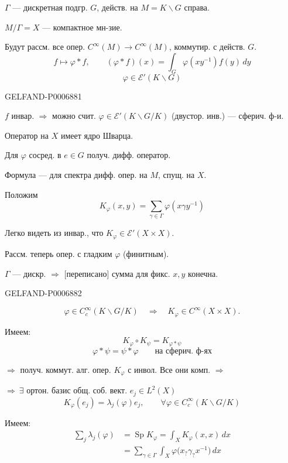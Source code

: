 \(\Gamma\) --- дискретная подгр. \(G\), действ. на \(M=K\backslash G\) справа.

\(M/\Gamma=X\) --- компактное мн-зие.

Будут рассм. все опер. \(C^\infty(M)\to C^\infty(M)\),
коммутир. с действ. \(G\).
\[
f\longmapsto\varphi*f,\qquad
(\varphi*f)(x)=\int_G\varphi(xy^{-1})f(y)\,dy
\]
\[
\varphi\in\mathcal E'(K\backslash G)
\]


\begin{GelfandAdjacentEvidence}{GELFAND-P000688}{1}

\(f\) инвар. \(\Rightarrow\) можно счит.
\(\varphi\in\mathcal E'(K\backslash G/K)\)
(двустор. инв.) --- сферич. ф-и.

Оператор на \(X\) имеет ядро Шварца.

Для \(\varphi\) сосред. в \(e\in G\) получ. дифф. оператор.

Формула --- для спектра дифф. опер. на \(M\), спущ. на \(X\).

Положим
\[
K_\varphi(x,y)=\sum_{\gamma\in\Gamma}\varphi(x\gamma y^{-1})
\]

Легко видеть из инвар., что \(K_\varphi\in\mathcal E'(X\times X)\).

Рассм. теперь опер. с гладким \(\varphi\) (финитным).

\(\Gamma\) --- дискр. \(\Rightarrow\) [переписано] сумма для фикс. \(x,y\) конечна.
\end{GelfandAdjacentEvidence}
\begin{GelfandAdjacentEvidence}{GELFAND-P000688}{2}

\[
\varphi\in C_c^\infty(K\backslash G/K)
\quad\Rightarrow\quad K_\varphi\in C^\infty(X\times X).
\]

Имеем:
\[
K_\varphi\circ K_\psi=K_{\varphi*\psi}
\]
\[
\varphi*\psi=\psi*\varphi\qquad\text{на сферич. ф-ях}
\]

\(\Rightarrow\) получ. коммут. алг. опер. \(K_\varphi\) с инвол.
Все они комп. \(\Rightarrow\)

\(\Rightarrow\ \exists\) ортон. базис общ. соб. вект. \(e_j\in L^2(X)\)
\[
K_\varphi(e_j)=\lambda_j(\varphi)e_j,\qquad
\forall\varphi\in C_c^\infty(K\backslash G/K)
\]

Имеем:
\[
\begin{aligned}
\sum_j\lambda_j(\varphi)
&=\operatorname{Sp}K_\varphi
 =\int_XK_\varphi(x,x)\,dx\\
&=\sum_{\gamma\in\Gamma}\int_X
 \varphi\bigl(x_{?}\gamma_{?}x^{-1}\bigr)\,dx
\end{aligned}
\]
\end{GelfandAdjacentEvidence}
